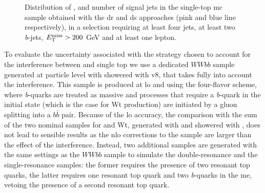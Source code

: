 \begin{figure}[h!]
\centering 
{}
\caption{Distribution of  \met,   \mtb and  number of signal jets in the single-top \gls{mc} sample obtained with the \gls{dr} and \gls{ds} approaches (pink and blue line respectively), in a selection requiring at least four jets, at least two \textit{b}-jets, $E_{\rm T}^{\mathrm{miss}}>200$ GeV and at least one lepton. 
}\label{fig:st_1L}
\end{figure}

To evaluate the uncertainty associated with the strategy chosen to account for the interference between \ttbar and single top
we use a dedicated $WWbb$ sample generated at particle level with \aNLO showered with \PY v8, that takes fully into account the interference.
This sample is produced at \gls{lo} and using the four-flavor scheme, where \textit{b}-quarks are treated as massive and processes that require a \textit{b}-quark in the initial state (which is the case for Wt production) are initiated by a gluon splitting into a $b\bar{b}$ pair. 
Because of the \gls{lo} accuracy, the comparison with the sum of the two nominal samples for \ttbar and Wt, generated with \PowhegBox and showered with \PY, does not lead to sensible 
results as the \gls{nlo} corrections to the \ttbar sample are larger than the effect of the interference. 
Instead, two additional samples are generated with the same settings as the $WWbb$ sample to simulate the double-resonance and the single-resonance samples: the former requires the presence of two resonant top quarks, the latter requires one resonant top quark and two \textit{b}-quarks in the \gls{me}, vetoing the presence of a second resonant top quark.  


